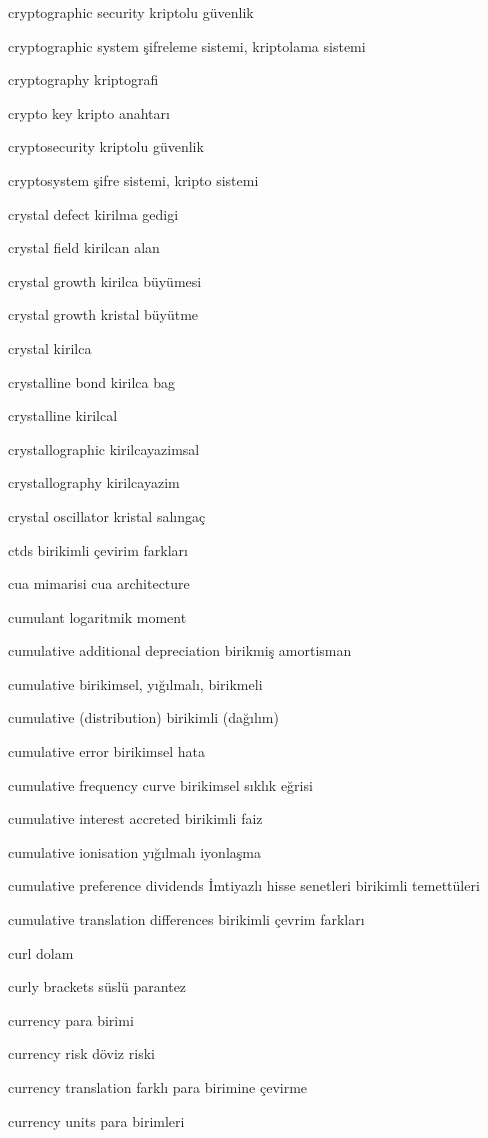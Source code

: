 \documentclass[12pt,fleqn]{article}\usepackage{../../common}
\begin{document}
cryptographic security kriptolu güvenlik

cryptographic system şifreleme sistemi, kriptolama sistemi

cryptography kriptografi

crypto key kripto anahtarı

cryptosecurity kriptolu güvenlik

cryptosystem şifre sistemi, kripto sistemi

crystal defect kirilma gedigi

crystal field kirilcan alan

crystal growth kirilca büyümesi

crystal growth kristal büyütme

crystal kirilca

crystalline bond kirilca bag

crystalline kirilcal

crystallographic kirilcayazimsal

crystallography kirilcayazim

crystal oscillator kristal salıngaç

ctds birikimli çevirim farkları

cua mimarisi cua architecture

cumulant logaritmik moment

cumulative additional depreciation birikmiş amortisman

cumulative birikimsel, yığılmalı, birikmeli

cumulative (distribution) birikimli (dağılım)

cumulative error birikimsel hata

cumulative frequency curve birikimsel sıklık eğrisi

cumulative interest accreted birikimli faiz

cumulative ionisation yığılmalı iyonlaşma

cumulative preference dividends İmtiyazlı hisse senetleri birikimli temettüleri

cumulative translation differences birikimli çevrim farkları

curl dolam

curly brackets süslü parantez

currency para birimi

currency risk döviz riski

currency translation farklı para birimine çevirme

currency units para birimleri
\end{document}

